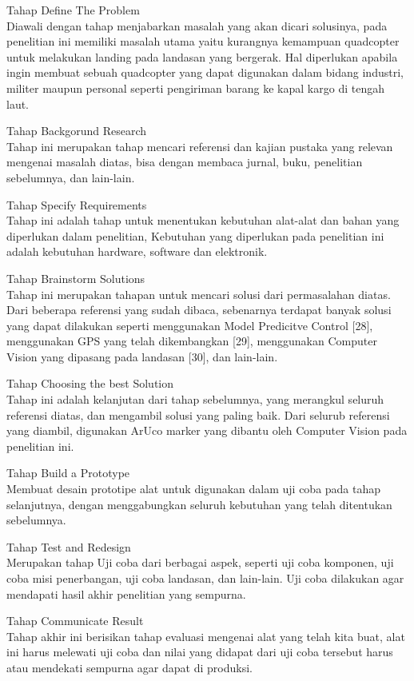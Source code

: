 \begin{packed_enum}
	\item Tahap Define The Problem
	\\Diawali dengan tahap menjabarkan masalah yang akan dicari solusinya, pada penelitian ini memiliki masalah utama yaitu kurangnya kemampuan quadcopter untuk melakukan landing pada landasan yang bergerak. Hal diperlukan apabila ingin membuat sebuah quadcopter yang dapat digunakan dalam bidang industri, militer maupun personal seperti pengiriman barang ke kapal kargo di tengah laut.
	\item Tahap Backgorund Research
	\\Tahap ini merupakan tahap mencari referensi dan kajian pustaka yang relevan mengenai masalah diatas, bisa dengan membaca jurnal, buku, penelitian sebelumnya, dan lain-lain.
	\item Tahap Specify Requirements
	\\Tahap ini adalah tahap untuk menentukan kebutuhan alat-alat dan bahan yang diperlukan dalam penelitian, Kebutuhan yang diperlukan pada penelitian ini adalah kebutuhan hardware, software dan elektronik.
	\item Tahap Brainstorm Solutions
	\\Tahap ini merupakan tahapan untuk mencari solusi dari permasalahan diatas. Dari beberapa referensi yang sudah dibaca, sebenarnya terdapat banyak solusi yang dapat dilakukan seperti menggunakan Model Predicitve Control [28], menggunakan GPS yang telah dikembangkan [29], menggunakan Computer Vision yang dipasang pada landasan [30], dan lain-lain.
	\item Tahap Choosing the best Solution
	\\ Tahap ini adalah kelanjutan dari tahap sebelumnya, yang merangkul seluruh referensi diatas, dan mengambil solusi yang paling baik. Dari selurub referensi yang diambil, digunakan ArUco marker yang dibantu oleh Computer Vision pada penelitian ini.
	\item Tahap Build a Prototype
	\\ Membuat desain prototipe alat untuk digunakan dalam uji coba pada tahap selanjutnya, dengan menggabungkan seluruh kebutuhan yang telah ditentukan sebelumnya.
	\item Tahap Test and Redesign
	\\ Merupakan tahap Uji coba dari berbagai aspek, seperti uji coba komponen, uji coba misi penerbangan, uji coba landasan, dan lain-lain. Uji coba dilakukan agar mendapati hasil akhir penelitian yang sempurna.
	\item Tahap Communicate Result
	\\Tahap akhir ini berisikan tahap evaluasi mengenai alat yang telah kita buat, alat ini harus melewati uji coba dan nilai yang didapat dari uji coba tersebut harus atau mendekati sempurna agar dapat di produksi.
\end{packed_enum}

